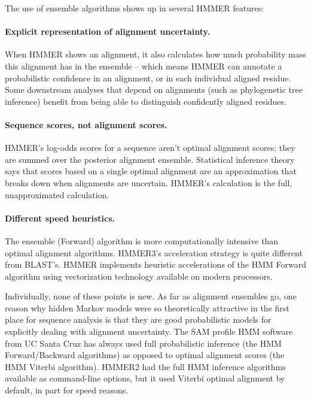 The use of ensemble algorithms shows up in several HMMER features:

\paragraph{Explicit representation of alignment uncertainty.}
  When HMMER shows an alignment, it also calculates how much
  probability mass this alignment has in the ensemble -- which
  means HMMER can annotate a probabilistic confidence in an alignment,
  or in each individual aligned residue. Some downstream analyses that
  depend on alignments (such as phylogenetic tree inference) benefit
  from being able to distinguish confidently aligned residues.

\paragraph{Sequence scores, not alignment scores.} HMMER's
  log-odds scores for a sequence aren't optimal alignment scores; they
  are summed over the posterior alignment ensemble. Statistical
  inference theory says that scores based on a single optimal
  alignment are an approximation that breaks down when alignments are
  uncertain. HMMER's calculation is the full, unapproximated
  calculation.
 
\paragraph{Different speed heuristics.} The ensemble (Forward) algorithm is more
  computationally intensive than optimal alignment algorithms.
  HMMER3's acceleration strategy is quite different from
  BLAST's\cite{Eddy11}.  HMMER implements heuristic accelerations of
  the HMM Forward algorithm using vectorization technology available
  on modern processors.\vspace{1em}

Individually, none of these points is new. As far as alignment
ensembles go, one reason why hidden Markov models were so
theoretically attractive in the first place for sequence analysis is
that they are good probabilistic models for explicitly dealing with
alignment uncertainty. The SAM profile HMM software from UC Santa Cruz
has always used full probabilistic inference (the HMM Forward/Backward
algorithms) as opposed to optimal alignment scores (the HMM Viterbi
algorithm). HMMER2 had the full HMM inference algorithms available as
command-line options, but it used Viterbi optimal alignment by
default, in part for speed reasons.

